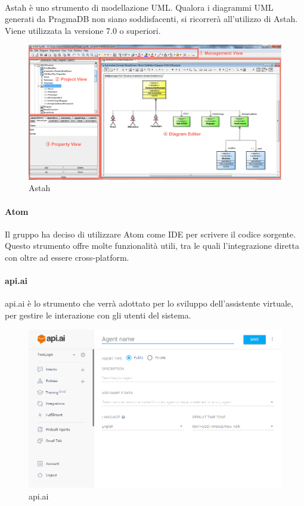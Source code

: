   \paragraph{}
  Astah è uno strumento di modellazione UML. Qualora i diagrammi UML generati da PragmaDB non siano soddisfacenti, si ricorrerà all'utilizzo di Astah. Viene utilizzata la versione 7.0 o superiori.
\begin{figure}[h]
\centering
\includegraphics[scale=0.3]{img/astah.png}
\caption{Astah}\label{sec:Figura1}
\end{figure}

\paragraph{Atom}
Il gruppo ha deciso di utilizzare Atom come IDE per scrivere il codice sorgente. Questo strumento offre molte funzionalità utili, tra le quali l'integrazione diretta con  oltre ad essere cross-platform.

\paragraph{api.ai}
api.ai è lo strumento che verrà adottato per lo sviluppo dell'assistente virtuale, per gestire le interazione con gli utenti del sistema.
\begin{figure}[h]
\centering
\includegraphics[scale=0.5]{img/api_ai.png}
\caption{api.ai}\label{sec:Figura1}
\end{figure}

\newpage

